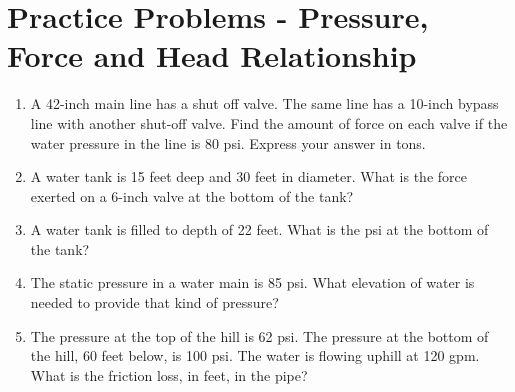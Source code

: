 \section*{Practice Problems - Pressure, Force and Head Relationship}
\begin{enumerate}
  \item A 42-inch main line has a shut off valve. The same line has a 10-inch bypass line with another shut-off valve. Find the amount of force on each valve if the water pressure in the line is 80 psi. Express your answer in tons.\\

  \item A water tank is 15 feet deep and 30 feet in diameter. What is the force exerted on a 6-inch valve at the bottom of the tank?\\

\item A water tank is filled to depth of 22 feet. What is the psi at the bottom of the tank?\\

\item The static pressure in a water main is 85 psi. What elevation of water is needed to provide that kind of pressure?\\

\item The pressure at the top of the hill is 62 psi. The pressure at the bottom of the hill, 60 feet below, is 100 psi. The water is flowing uphill at 120 gpm. What is the friction loss, in feet, in the pipe?\\
\end{enumerate}
\vspace{1cm}

